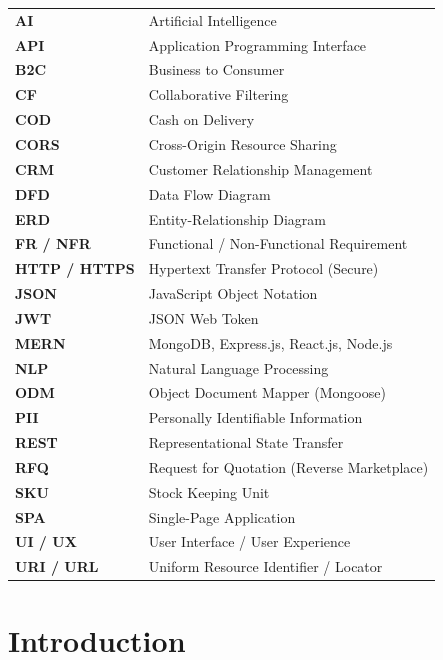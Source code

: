 \documentclass[a4paper, 12pt, oneside]{report}
\renewcommand{\arraystretch}{1.1}
\begin{document}
\begin{center}
\renewcommand{\arraystretch}{1.25}
\begin{tabular}{p{3.2cm} p{10.2cm}}
\textbf{AI} & Artificial Intelligence \\
\textbf{API} & Application Programming Interface \\
\textbf{B2C} & Business to Consumer \\
\textbf{CF} & Collaborative Filtering \\
\textbf{COD} & Cash on Delivery \\
\textbf{CORS} & Cross-Origin Resource Sharing \\
\textbf{CRM} & Customer Relationship Management \\
\textbf{DFD} & Data Flow Diagram \\
\textbf{ERD} & Entity-Relationship Diagram \\
\textbf{FR / NFR} & Functional / Non-Functional Requirement \\
\textbf{HTTP / HTTPS} & Hypertext Transfer Protocol (Secure) \\
\textbf{JSON} & JavaScript Object Notation \\
\textbf{JWT} & JSON Web Token \\
\textbf{MERN} & MongoDB, Express.js, React.js, Node.js \\
\textbf{NLP} & Natural Language Processing \\
\textbf{ODM} & Object Document Mapper (Mongoose) \\
\textbf{PII} & Personally Identifiable Information \\
\textbf{REST} & Representational State Transfer \\
\textbf{RFQ} & Request for Quotation (Reverse Marketplace) \\
\textbf{SKU} & Stock Keeping Unit \\
\textbf{SPA} & Single-Page Application \\
\textbf{UI / UX} & User Interface / User Experience \\
\textbf{URI / URL} & Uniform Resource Identifier / Locator \\
\end{tabular}
\end{center}


\chapter{Introduction}

\end{document}

